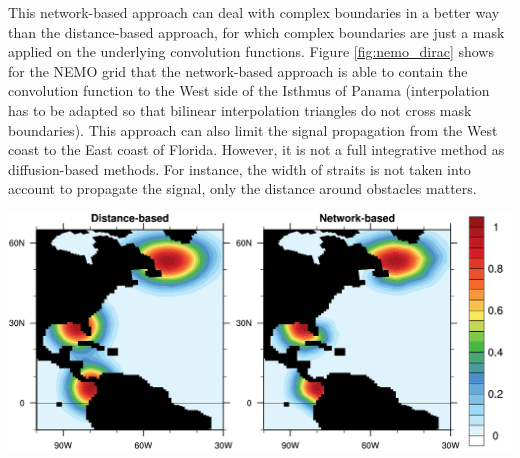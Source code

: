 \documentclass[12pt]{scrartcl}
\begin{document}
This network-based approach can deal with complex boundaries in a better way than the distance-based approach, for which complex boundaries are just a mask applied on the underlying convolution functions. Figure \ref{fig:nemo_dirac} shows for the NEMO grid that the network-based approach is able to contain the convolution function to the West side of the Isthmus of Panama (interpolation has to be adapted so that bilinear interpolation triangles do not cross mask boundaries). This approach can also limit the signal propagation from the West coast to the East coast of Florida. However, it is not a full integrative method as diffusion-based methods. For instance, the width of straits is not taken into account to propagate the signal, only the distance around obstacles matters.

\begin{center}
\includegraphics[width=0.9\linewidth]{nemo_dirac_001.pdf}
\end{center}
\end{document}
